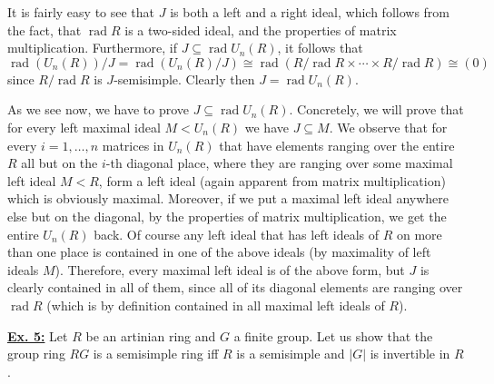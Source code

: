 \documentclass[a4paper, 12pt]{article}
\DeclareMathOperator{\rad}{rad}
\newcommand{\iso}{\cong}
\begin{document}
It is fairly easy to see that $J$ is both a left and a right ideal, which follows from the fact, that $\rad R$ is a two-sided ideal, and the properties of matrix multiplication.
Furthermore, if $J \subseteq \rad U_n(R)$, it follows that
\[
\rad(U_n(R)) / J = \rad(U_n(R) / J) \iso \rad(R/\rad R \times \cdots \times R / \rad R) \iso (0)
\]
since $R /\rad R$ is $J$-semisimple. Clearly then $J = \rad U_n(R)$.

As we see now, we have to prove $J \subseteq \rad U_n(R)$. Concretely, we will prove that for every left maximal ideal $M < U_n(R)$ we have $J \subseteq M$. We observe that for every $i = 1, \dots, n$ matrices in $U_n(R)$ that have elements ranging over the entire $R$ all but on the $i$-th diagonal place, where they are ranging over some maximal left ideal $M < R$, form a left ideal (again apparent from matrix multiplication) which is obviously maximal. Moreover, if we put a maximal left ideal anywhere else but on the diagonal, by the properties of matrix multiplication, we get the entire $U_n(R)$ back. Of course any left ideal that has left ideals of $R$ on more than one place is contained in one of the above ideals (by maximality of left ideals $M$). Therefore, every maximal left ideal is of the above form, but $J$ is clearly contained in all of them, since all of its diagonal elements are ranging over $\rad R$ (which is by definition contained in all maximal left ideals of $R$).
\newline

\underline{\textbf{Ex. 5:}}
Let $R$ be an artinian ring and $G$ a finite group. Let us show that the group ring $RG$ is a semisimple ring iff $R$ is a semisimple and $|G|$ is invertible in $R$.
\end{document}

